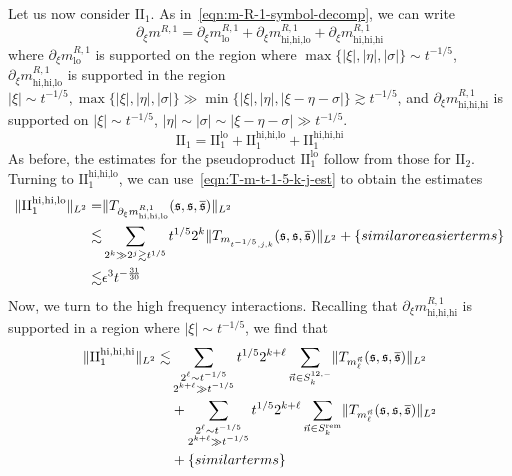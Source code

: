 \documentclass[letterpaper, reqno,final]{amsart}
\newcommand{\fs}{\mathfrak{s}}
\newcommand{\rmII}{\mathrm{II}}
\newcommand{\btext}[1]{\left\{\textup{#1}\right\}}
\newcommand{\bsim}{\btext{similar terms}}
\newcommand{\bsime}{\btext{similar or easier terms}}
\begin{document}
Let us now consider $\rmII_1$.  As in~\eqref{eqn:m-R-1-symbol-decomp}, we can write
\begin{equation*}
    \partial_\xi m^{R,1} = \partial_\xi m^{R,1}_{\text{lo}} + \partial_\xi m^{R,1}_{\text{hi,hi,lo}} + \partial_\xi m^{R,1}_{\text{hi,hi,hi}}
\end{equation*}
where $\partial_\xi m^{R,1}_{\text{lo}}$ is supported on the region where $\max\{|\xi|, |\eta|, |\sigma|\} \sim t^{-1/5}$, $\partial_\xi m^{R,1}_{\text{hi,hi,lo}}$ is supported in the region $|\xi| \sim t^{-1/5}, \max\{|\xi|, |\eta|, |\sigma|\} \gg \min\{|\xi|, |\eta|, |\xi - \eta -\sigma|\} \gtrsim t^{-1/5}$, and $\partial_\xi m^{R,1}_{\text{hi,hi,hi}}$ is supported on $|\xi| \sim t^{-1/5}$, $|\eta| \sim |\sigma| \sim |\xi - \eta - \sigma| \gg t^{-1/5}$.  
\begin{equation*}
    \rmII_1 = \rmII_1^\text{lo} + \rmII_1^\text{hi,hi,lo} + \rmII_1^\text{hi,hi,hi} 
\end{equation*}
As before, the estimates for the pseudoproduct $\rmII_1^{\text{lo}}$ follow from those for $\rmII_2$.  Turning to $\rmII_1^\text{hi,hi,lo}$, we can use~\eqref{eqn:T-m-t-1-5-k-j-est} to obtain the estimates
\begin{equation*}\begin{split}
    \lVert \rmII_1^{\text{hi,hi,lo}} \rVert_{L^2} =& \lVert T_{\partial_\xi m^{R,1}_\text{hi,hi,lo}}(\fs, \fs,\overline{\fs}) \rVert_{L^2}\\
    \lesssim& \sum_{2^k \gg 2^j \gtrsim t^{{1/5}}} t^{1/5} 2^k \lVert T_{m_{t^{-1/5},j,k}} (\fs, \fs, \overline{\fs}) \rVert_{L^2} + \bsime\\
    \lesssim& \epsilon^3 t^{-\frac{31}{30}}
\end{split}\end{equation*}
Now, we turn to the high frequency interactions.  Recalling that $\partial_\xi m^{R,1}_{\text{hi,hi,hi}}$ is supported in a region where $|\xi| \sim t^{-1/5}$, we find that
\begin{subequations}\begin{align}
    \lVert \rmII_1^{\text{hi,hi,hi}} \rVert_{L^2} \lesssim& \sum_{\substack{2^\ell \sim t^{-1/5}\\2^{k+\ell} \gg t^{-1/5}}} t^{1/5} 2^{k + \ell} \sum_{\vec{n} \in S_k^{12,-}} \lVert T_{m_\ell^{\vec{n}}}(\fs, \fs, \overline{\fs})\rVert_{L^2}\label{eqn:dxi-n1-like-n2}\\
    &+ \sum_{\substack{2^\ell \sim t^{-1/5}\\2^{k+\ell} \gg t^{-1/5}}} t^{1/5} 2^{k + \ell} \sum_{\vec{n} \in S_k^{\text{rem}}} \lVert T_{m_\ell^{\vec{n}}}(\fs, \fs, \overline{\fs})\rVert_{L^2}\label{eqn:dxi-all-n-different}\\
    &+ \bsim\notag
\end{align}\end{subequations}
\end{document}
